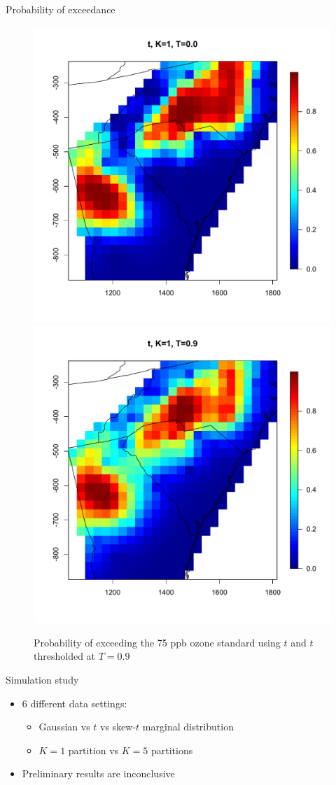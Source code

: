 \documentclass{beamer}
\begin{document}
\begin{frame}{Probability of exceedance}
\centering
\begin{figure}
    \includegraphics[width=.5\linewidth]{./plots/p-exceed-std-t10.pdf}
    \includegraphics[width=.5\linewidth]{./plots/p-exceed-std-t19.pdf}
    \caption{Probability of exceeding the 75 ppb ozone standard using $t$ and $t$ thresholded at $T=0.9$}
\end{figure}
\end{frame}

\begin{frame}{Simulation study}
  \begin{itemize} \setlength{\itemsep}{0.5em}
    \item 6 different data settings:
    \begin{itemize}
    	\item Gaussian vs $t$ vs skew-$t$ marginal distribution
        \item $K=1$ partition vs $K=5$ partitions
    \end{itemize}
    \item Preliminary results are inconclusive
  \end{itemize}
\end{frame}
\end{document}
